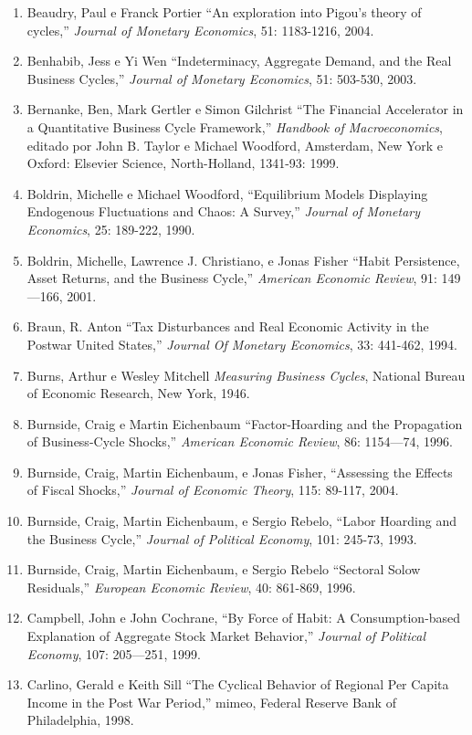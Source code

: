 \documentclass[12pt]{article}
\begin{document}
\begin{enumerate}
    \item Beaudry, Paul e Franck Portier “An exploration into Pigou’s theory of cycles,” \textit{Journal of Monetary Economics}, 51: 1183-1216, 2004.
    \item Benhabib, Jess e Yi Wen “Indeterminacy, Aggregate Demand, and the Real Business Cycles,” \textit{Journal of Monetary Economics}, 51: 503-530, 2003.
    \item Bernanke, Ben, Mark Gertler e Simon Gilchrist “The Financial Accelerator in a Quantitative Business Cycle Framework,” \textit{Handbook of Macroeconomics}, editado por John B. Taylor e Michael Woodford, Amsterdam, New York e Oxford: Elsevier Science, North-Holland, 1341-93: 1999.
    \item Boldrin, Michelle e Michael Woodford, “Equilibrium Models Displaying Endogenous Fluctuations and Chaos: A Survey,” \textit{Journal of Monetary Economics}, 25: 189-222, 1990.
    \item Boldrin, Michelle, Lawrence J. Christiano, e Jonas Fisher “Habit Persistence, Asset Returns, and the Business Cycle,” \textit{American Economic Review}, 91: 149—166, 2001.
    \item Braun, R. Anton “Tax Disturbances and Real Economic Activity in the Postwar United States,” \textit{Journal Of Monetary Economics}, 33: 441-462, 1994.
    \item Burns, Arthur e Wesley Mitchell \textit{Measuring Business Cycles}, National Bureau of Economic Research, New York, 1946.
    \item Burnside, Craig e Martin Eichenbaum “Factor-Hoarding and the Propagation of Business-Cycle Shocks,” \textit{American Economic Review}, 86: 1154—74, 1996.
    \item Burnside, Craig, Martin Eichenbaum, e Jonas Fisher, “Assessing the Effects of Fiscal Shocks,” \textit{Journal of Economic Theory}, 115: 89-117, 2004.
    \item Burnside, Craig, Martin Eichenbaum, e Sergio Rebelo, “Labor Hoarding and the Business Cycle,” \textit{Journal of Political Economy}, 101: 245-73, 1993.
    \item Burnside, Craig, Martin Eichenbaum, e Sergio Rebelo “Sectoral Solow Residuals,” \textit{European Economic Review}, 40: 861-869, 1996.
    \item Campbell, John e John Cochrane, “By Force of Habit: A Consumption-based Explanation of Aggregate Stock Market Behavior,” \textit{Journal of Political Economy}, 107: 205—251, 1999.
    \item Carlino, Gerald e Keith Sill “The Cyclical Behavior of Regional Per Capita Income in the Post War Period,” mimeo, Federal Reserve Bank of Philadelphia, 1998.

\end{enumerate}
\end{document}
